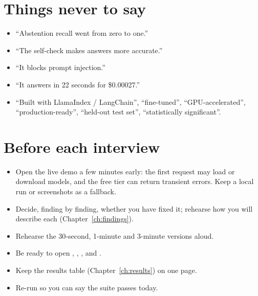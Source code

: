 \section{Things never to say}

\begin{itemize}
  \item \enquote{Abstention recall went from zero to one.}
  \item \enquote{The self-check makes answers more accurate.}
  \item \enquote{It blocks prompt injection.}
  \item \enquote{It answers in 22 seconds for \$0.00027.}
  \item \enquote{Built with LlamaIndex / LangChain}, \enquote{fine-tuned}, \enquote{GPU-accelerated}, \enquote{production-ready}, \enquote{held-out test set}, \enquote{statistically significant}.
\end{itemize}

\section{Before each interview}

\begin{itemize}
  \item Open the live demo a few minutes early: the first request may load or download models, and the free tier can return transient errors. Keep a local run or screenshots as a fallback.
  \item Decide, finding by finding, whether you have fixed it; rehearse how you will describe each (Chapter~\ref{ch:findings}).
  \item Rehearse the 30-second, 1-minute and 3-minute versions aloud.
  \item Be ready to open , , ,  and .
  \item Keep the results table (Chapter~\ref{ch:results}) on one page.
  \item Re-run  so you can say the suite passes today.
\end{itemize}
